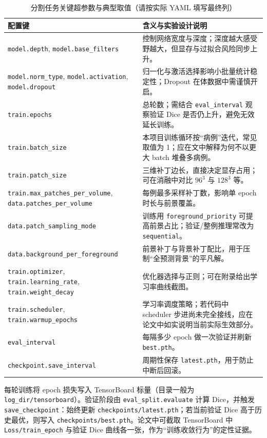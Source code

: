 \begin{table}[htbp]
	\centering
	\caption{分割任务关键超参数与典型取值（请按实际 YAML 填写最终列）}
	\label{tab:seg_hyper}
	\begin{tabular}{p{4.2cm}p{7.8cm}}
		\toprule
		配置键 & 含义与实验设计说明 \\
		\midrule
		\texttt{model.depth}, \texttt{model.base\_filters} & 控制网络宽度与深度；深度越大感受野越大，但显存与过拟合风险同步上升。 \\
		\texttt{model.norm\_type}, \texttt{model.activation}, \texttt{model.dropout} & 归一化与激活选择影响小批量统计稳定性；Dropout 在体数据中需谨慎开启。 \\
		\texttt{train.epochs} & 总轮数；需结合 \texttt{eval\_interval} 观察验证 Dice 是否仍上升，避免无效延长训练。 \\
		\texttt{train.batch\_size} & 本项目训练循环按“病例”迭代，常见取值为 1；应在文中解释为何不以更大 batch 堆叠多病例。 \\
		\texttt{train.patch\_size} & 三维补丁边长，直接决定显存占用；可在消融中对比 $96^3$ 与 $128^3$ 等。 \\
		\texttt{train.max\_patches\_per\_volume}, \texttt{data.patches\_per\_volume} & 每例最多采样补丁数，影响单 epoch 时长与前景覆盖。 \\
		\texttt{data.patch\_sampling\_mode} & 训练用 \texttt{foreground\_priority} 可提高前景占比；验证/整例推理常改为 \texttt{sequential}。 \\
		\texttt{data.background\_per\_foreground} & 前景补丁与背景补丁配比，用于压制“全预测背景”的平凡解。 \\
		\texttt{train.optimizer}, \texttt{train.learning\_rate}, \texttt{train.weight\_decay} & 优化器选择与正则；可在附录给出学习率曲线截图。 \\
		\texttt{train.scheduler}, \texttt{train.warmup\_epochs} & 学习率调度策略；若代码中 scheduler 步进尚未完全接线，应在论文中如实说明当前实际生效部分。 \\
		\texttt{eval\_interval} & 每隔多少 epoch 做一次验证并刷新 \texttt{best.pth}。 \\
		\texttt{checkpoint.save\_interval} & 周期性保存 \texttt{latest.pth}，用于防止中断后回滚。 \\
		\bottomrule
	\end{tabular}
\end{table}

每轮训练将 epoch 损失写入 TensorBoard 标量（目录一般为 \texttt{log\_dir/tensorboard}）。验证阶段由 \texttt{eval\_split.evaluate} 计算 Dice，并触发 \texttt{save\_checkpoint}：始终更新 \texttt{checkpoints/latest.pth}；若当前验证 Dice 高于历史最优，则写入 \texttt{checkpoints/best.pth}。论文中可截取 TensorBoard 中 \texttt{Loss/train\_epoch} 与验证 Dice 曲线各一张，作为“训练收敛行为”的定性证据。

